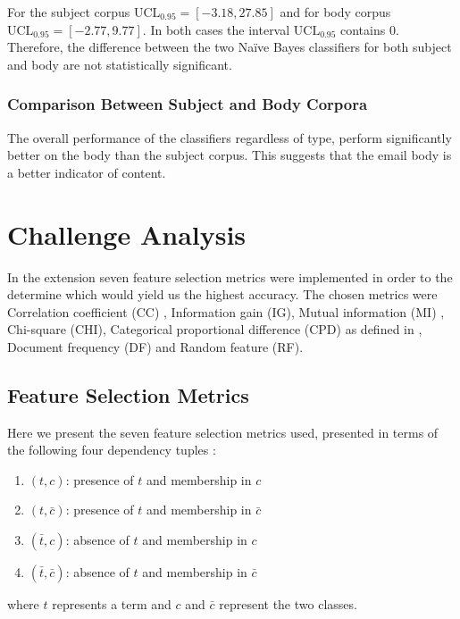 \documentclass[10pt, a4paper]{article}
\begin{document}
For the subject corpus $\text{UCL}_{0.95} = [-3.18, 27.85]$ and for body corpus $\text{UCL}_{0.95} = [-2.77, 9.77]$. In both cases the interval $\text{UCL}_{0.95}$ contains 0. Therefore, the difference between the two Na\"ive Bayes classifiers for both subject and body are not statistically significant.

\subsubsection{Comparison Between Subject and Body Corpora}

The overall performance of the classifiers regardless of type, perform significantly better on the body than the subject corpus. This suggests that the email body is a better indicator of content.

\section{Challenge Analysis}


In the extension seven feature selection metrics were implemented in order to the determine which would yield us the highest accuracy. The chosen metrics were Correlation coefficient (CC) \cite{CC}, Information gain (IG), Mutual information (MI) \cite{IG}, Chi-square (CHI), Categorical proportional difference (CPD) as defined in \cite{CPD}, Document frequency (DF) and Random feature (RF).

\subsection{Feature Selection Metrics}
Here we present the seven feature selection metrics used, presented in terms of the following four dependency tuples \cite{IG}:
\begin{enumerate}
\item $(t,c)$: presence of $t$ and membership in $c$
\item $(t,\bar{c})$: presence of $t$ and membership in $\bar{c}$
\item $(\bar{t},c)$: absence of $t$ and membership in $c$
\item $(\bar{t},\bar{c})$: absence of $t$ and membership in $\bar{c}$
\end{enumerate}
where $t$ represents a term and $c$ and $\bar{c}$ represent the two classes.
\end{document}

